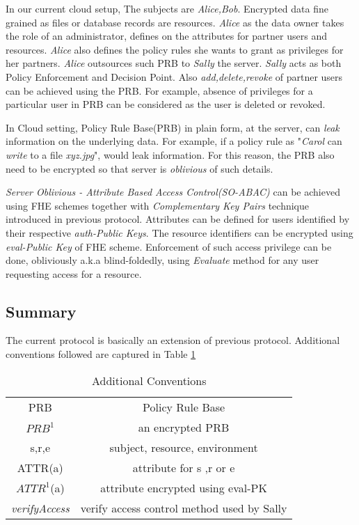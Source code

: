 \documentclass[conference]{IEEEtran}
\numberwithin{equation}{section}
\begin{document}
In our current cloud setup, The subjects are \emph{Alice,Bob}. Encrypted data fine grained as files or database records are resources. \emph{Alice} as the data owner takes the role of an administrator, defines on the attributes for partner users and resources. \emph{Alice} also defines the policy rules she wants to grant as privileges for her partners. \emph{Alice} outsources such PRB to \emph{Sally} the server. \emph{Sally} acts as both Policy Enforcement and Decision Point. Also \emph{add,delete,revoke} of partner users can be achieved using the PRB. For example, absence of privileges for a particular user in PRB can be considered as the user is deleted or revoked.

In Cloud setting, Policy Rule Base(PRB) in plain form, at the server, can \emph{leak} information on the underlying data. For example, if a policy rule as "\emph{Carol} can \emph{write} to a file \emph{xyz.jpg}", would leak information. For this reason, the PRB also need to be encrypted so that server is \emph{oblivious} of such details.

\emph{Server Oblivious - Attribute Based Access Control(SO-ABAC)} can be achieved using FHE schemes together with \emph{Complementary Key Pairs} technique introduced in previous protocol. Attributes can be defined for users identified by their respective \emph{auth-Public Keys}. The resource identifiers can be encrypted using \emph{eval-Public Key} of FHE scheme. Enforcement of such access privilege can be done, obliviously a.k.a blind-foldedly, using \emph{Evaluate} method for any user requesting access for a resource.
\subsection{Summary}
The current protocol is basically an extension of previous protocol. Additional conventions followed are captured in Table \ref{conventionAddl}
\begin{table}
\caption {Additional Conventions} 
\label{conventionAddl}
\renewcommand{\arraystretch}{2.5}
\begin{center}
\begin{tabular} {|c  c|}
\hline
{PRB} & {Policy Rule Base} \\
{$PRB^1$} & {an encrypted PRB} \\
{s,r,e} & {subject, resource, environment} \\
{ATTR(a)} & {attribute for s ,r or e} \\
{$ATTR^1$(a)} & {attribute encrypted using eval-PK} \\
{\emph{verifyAccess}}&{verify access control method used by Sally} \\
 \hline
\end{tabular}
\end{center}
\end{table}
\end{document}
